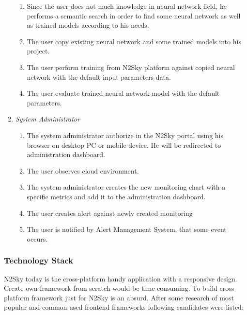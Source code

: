 \begin{enumerate}
\begin{enumerate}
\item Since the user does not much knowledge in neural network field, he performs a semantic search in order to find some neural network as well as trained models according to his needs.
\item The user copy existing neural network and some trained models into his project. 
\item The user perform training from N2Sky platform against copied neural network with the default input parameters data.
\item The user evaluate trained neural network model with the default parameters. 
\end{enumerate}
\item \emph{System Administrator}
\begin{enumerate}
\item The system administrator authorize in the N2Sky portal using his browser on desktop PC or mobile device. He will be redirected to administration dashboard.
\item The user observes cloud environment.
\item The system administrator creates the new monitoring chart with a specific metrics and add it to the administration dashboard.
\item The user creates alert against newly created monitoring
\item The user is notified by Alert Management System, that some event occurs.
\end{enumerate}
\end{enumerate}




 

\subsubsection{Technology Stack}\label{Technology Stack}

N2Sky today is the cross-platform handy application with a responsive design. Create own framework from scratch would be time consuming. To build cross-platform framework just for N2Sky is an absurd. After some research of most popular and common used frontend frameworks following candidates were listed: 

